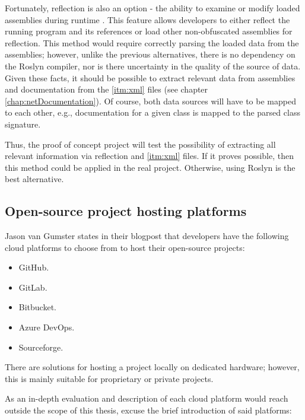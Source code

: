 Fortunately, reflection is also an option - the ability to examine or modify loaded assemblies during runtime \cite{akopyan_introduction_2022}. This feature allows developers to either reflect the running program and its references or load other non-obfuscated assemblies for reflection. This method would require correctly parsing the loaded data from the assemblies; however, unlike the previous alternatives, there is no dependency on the Roslyn compiler, nor is there uncertainty in the quality of the source of data. Given these facts, it should be possible to extract relevant data from assemblies and documentation from the \ref{itm:xml} files (see chapter \ref{chap:netDocumentation}). Of course, both data sources will have to be mapped to each other, e.g., documentation for a given class is mapped to the parsed class signature.

Thus, the proof of concept project will test the possibility of extracting all relevant information via reflection and \ref{itm:xml} files. If it proves possible, then this method could be applied in the real project. Otherwise, using Roslyn is the best alternative.

\subsection{Open-source project hosting platforms}
Jason van Gumster states in their blogpost \cite{gumster_6_2018} that developers have the following cloud platforms to choose from to host their open-source projects:
\begin{itemize}
    \item GitHub.
    \item GitLab.
    \item Bitbucket.
    \item Azure DevOps.
    \item Sourceforge.
\end{itemize}

There are solutions for hosting a project locally on dedicated hardware; however, this is mainly suitable for proprietary or private projects.

As an in-depth evaluation and description of each cloud platform would reach outside the scope of this thesis, excuse the brief introduction of said platforms:

